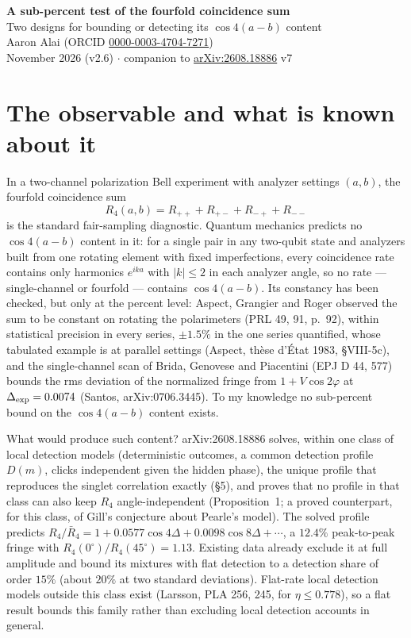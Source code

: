 \documentclass[10pt]{article}
\begin{document}
\begin{center}
{\Large\bfseries A sub-percent test of the fourfold coincidence sum}\\[3pt]
{\large Two designs for bounding or detecting its $\cos 4(a-b)$ content}\\[5pt]
Aaron Alai (ORCID \href{https://orcid.org/0000-0003-4704-7271}{0000-0003-4704-7271})\\
November 2026 (v2.6) $\cdot$ companion to \href{https://arxiv.org/abs/2608.18886}{arXiv:2608.18886} v7
\end{center}

\section*{The observable and what is known about it}
In a two-channel polarization Bell experiment with analyzer settings $(a,b)$, the fourfold coincidence sum
\[
R_4(a,b) = R_{++}+R_{+-}+R_{-+}+R_{--}
\]
is the standard fair-sampling diagnostic. Quantum mechanics predicts no $\cos 4(a-b)$ content in it: for a single pair in any two-qubit state and analyzers built from one rotating element with fixed imperfections, every coincidence rate contains only harmonics $e^{ika}$ with $|k|\le 2$ in each analyzer angle, so no rate --- single-channel or fourfold --- contains $\cos 4(a-b)$. Its constancy has been checked, but only at the percent level: Aspect, Grangier and Roger observed the sum to be constant on rotating the polarimeters (PRL 49, 91, p.~92), within statistical precision in every series, $\pm 1.5\%$ in the one series quantified, whose tabulated example is at parallel settings (Aspect, th\`ese d'\'Etat 1983, \S VIII-5c), and the single-channel scan of Brida, Genovese and Piacentini (EPJ D 44, 577) bounds the rms deviation of the normalized fringe from $1+V\cos 2\varphi$ at $\Delta_{\rm exp}=0.0074$ (Santos, arXiv:0706.3445). To my knowledge no sub-percent bound on the $\cos 4(a-b)$ content exists.

What would produce such content? arXiv:2608.18886 solves, within one class of local detection models (deterministic outcomes, a common detection profile $D(m)$, clicks independent given the hidden phase), the unique profile that reproduces the singlet correlation exactly (\S5), and proves that no profile in that class can also keep $R_4$ angle-independent (Proposition~1; a proved counterpart, for this class, of Gill's conjecture about Pearle's model). The solved profile predicts $R_4/\bar R_4 = 1 + 0.0577\cos 4\Delta + 0.0098\cos 8\Delta + \cdots$, a $12.4\%$ peak-to-peak fringe with $R_4(0^\circ)/R_4(45^\circ)=1.13$. Existing data already exclude it at full amplitude and bound its mixtures with flat detection to a detection share of order $15\%$ (about $20\%$ at two standard deviations). Flat-rate local detection models outside this class exist (Larsson, PLA 256, 245, for $\eta\le 0.778$), so a flat result bounds this family rather than excluding local detection accounts in general.
\end{document}
